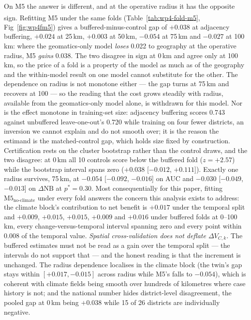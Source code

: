 \documentclass[11pt,a4paper]{article}
\providecommand{\REBUILD}{\textsuperscript{\ddag}}
\begin{document}
On M5 the answer is different, and at the operative radius it has the opposite sign.\REBUILD{} Refitting M5 under the same folds (Table~\ref{tab:wp4-fold-m5}, Fig~\ref{fig:wp4fm5}) gives a buffered-minus-control gap of $+0.038$ at adjacency buffering, $+0.024$ at 25\,km, $+0.003$ at 50\,km, $-0.054$ at 75\,km and $-0.027$ at 100\,km: where the geomatics-only model \emph{loses} 0.022 to geography at the operative radius, M5 \emph{gains} 0.038. The two disagree in sign at 0\,km and agree only at 100\,km, so the price of a fold is a property of the model as much as of the geography and the within-model result on one model cannot substitute for the other. The dependence on radius is not monotone either --- the gap turns at 75\,km and recovers at 100 --- so the reading that the cost grows steadily with radius, available from the geomatics-only model alone, is withdrawn for this model. Nor is the effect monotone in training-set size: adjacency buffering scores 0.743 against unbuffered leave-one-out's 0.720 while training on four fewer districts, an inversion we cannot explain and do not smooth over; it is the reason the estimand is the matched-control gap, which holds size fixed by construction. Certification rests on the cluster bootstrap rather than the control draws, and the two disagree: at 0\,km all 10 controls score below the buffered fold ($z=+2.57$) while the bootstrap interval spans zero ($+0.038$ [$-0.012$, $+0.111$]). Exactly one radius survives, 75\,km, at $-0.054$ [$-0.092$, $-0.016$] on AUC and $-0.030$ [$-0.049$, $-0.013$] on $\Delta\mathrm{NB}$ at $p^*=0.30$. Most consequentially for this paper, fitting $\text{M5}_{\text{no-climate}}$ under every fold answers the concern this analysis exists to address: the climate block's contribution to net benefit is $+0.017$ under the temporal split and $+0.009$, $+0.015$, $+0.015$, $+0.009$ and $+0.016$ under buffered folds at 0--100\,km, every change-versus-temporal interval spanning zero and every point within 0.008 of the temporal value. \emph{Spatial cross-validation does not deflate $\Delta V_{C,k}$.} The buffered estimates must not be read as a gain over the temporal split --- the intervals do not support that --- and the honest reading is that the increment is unchanged. The radius dependence localises in the climate block (the twin's gap stays within $[+0.017,-0.015]$ across radius while M5's falls to $-0.054$), which is coherent with climate fields being smooth over hundreds of kilometres where case history is not; and the national number hides district-level disagreement, the pooled gap at 0\,km being $+0.038$ while 15 of 26 districts are individually negative.
\end{document}
